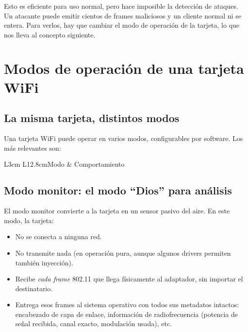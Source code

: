 \documentclass[11pt,a4paper]{article}
\begin{document}
Esto es eficiente para uso normal, pero hace imposible la detección de
ataques. Un atacante puede emitir cientos de frames maliciosos y un
cliente normal ni se entera. Para verlos, hay que cambiar el modo de
operación de la tarjeta, lo que nos lleva al concepto siguiente.

\section{Modos de operación de una tarjeta WiFi}

\subsection{La misma tarjeta, distintos modos}
Una tarjeta WiFi puede operar en varios modos, configurables por software.
Los más relevantes son:

\begin{datatable}{L{3cm} L{12.8cm}}{Modo & Comportamiento}
\end{datatable}

\subsection{Modo monitor: el modo ``Dios'' para análisis}
El modo monitor convierte a la tarjeta en un sensor pasivo del aire. En este
modo, la tarjeta:

\begin{itemize}
  \item No se conecta a ninguna red.
  \item No transmite nada (en operación pura, aunque algunos drivers
    permiten también inyección).
  \item Recibe \emph{cada frame} 802.11 que llega físicamente al
    adaptador, sin importar el destinatario.
  \item Entrega esos frames al sistema operativo con todos sus metadatos
    intactos: encabezado de capa de enlace, información de radiofrecuencia
    (potencia de señal recibida, canal exacto, modulación usada), etc.
\end{itemize}
\end{document}

